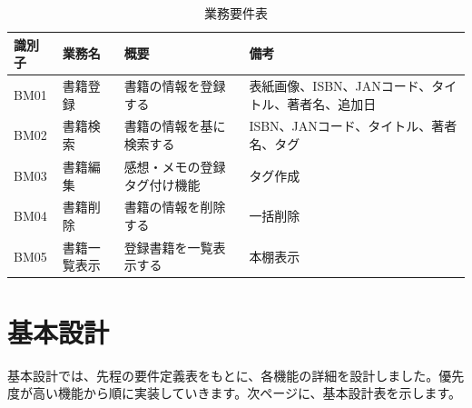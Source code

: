 \documentclass[a4paper, 11pt, titlepage]{jsarticle}
\begin{document}
\begin{table}[htbp]
  \centering
  \begin{tabular}{|l|l|>{\centering\arraybackslash}m{4cm}|>{\centering\arraybackslash}m{5cm}|}
    \hline
    \textbf{識別子} & \textbf{業務名} & \textbf{概要} & \textbf{備考} \\
    \hline\hline
    BM01 & 書籍登録 & 書籍の情報を登録する & 表紙画像、ISBN、JANコード、タイトル、著者名、追加日 \\
    \hline
    BM02 & 書籍検索 & 書籍の情報を基に検索する & ISBN、JANコード、タイトル、著者名、タグ \\
    \hline
    BM03 & 書籍編集 & 感想・メモの登録タグ付け機能 & タグ作成 \\
    \hline
    BM04 & 書籍削除 & 書籍の情報を削除する & 一括削除 \\
    \hline
    BM05 & 書籍一覧表示 & 登録書籍を一覧表示する & 本棚表示 \\
    \hline
  \end{tabular}
  \caption{業務要件表}
  \label{tab:requirements}
\end{table}

\section{基本設計}
基本設計では、先程の要件定義表をもとに、各機能の詳細を設計しました。優先度が高い機能から順に実装していきます。次ページに、基本設計表を示します。
\end{document}
